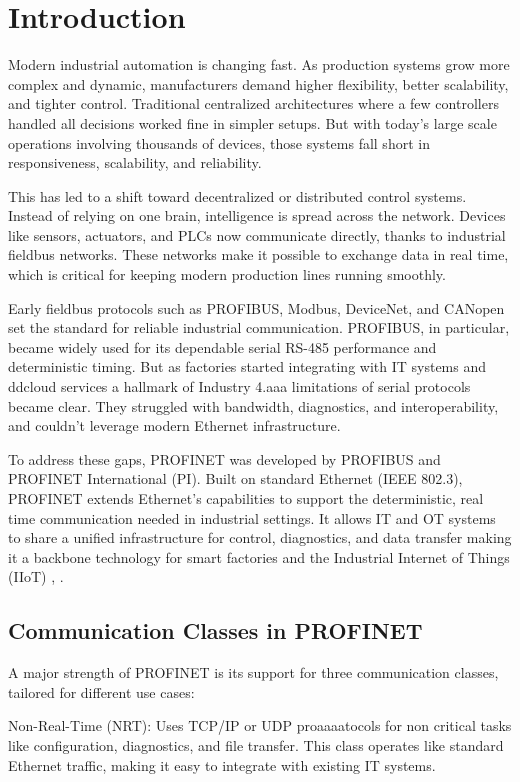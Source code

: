 \documentclass[conference]{IEEEtran}
\begin{document}
\section{Introduction}
Modern industrial automation is changing fast. As production systems grow more complex and dynamic, manufacturers demand higher flexibility, better scalability, and tighter control. Traditional centralized architectures where a few controllers handled all decisions worked fine in simpler setups. But with today’s large scale operations involving thousands of devices, those systems fall short in responsiveness, scalability, and reliability.

This has led to a shift toward decentralized or distributed control systems. Instead of relying on one brain, intelligence is spread across the network. Devices like sensors, actuators, and PLCs now communicate directly, thanks to industrial fieldbus networks. These networks make it possible to exchange data in real time, which is critical for keeping modern production lines running smoothly.

Early fieldbus protocols such as PROFIBUS, Modbus, DeviceNet, and CANopen set the standard for reliable industrial communication. PROFIBUS, in particular, became widely used for its dependable serial RS-485 performance and deterministic timing. But as factories started integrating with IT systems and ddcloud services a hallmark of Industry 4.aaa limitations of serial protocols became clear. They struggled with bandwidth, diagnostics, and interoperability, and couldn’t leverage modern Ethernet infrastructure.

To address these gaps, PROFINET was developed by PROFIBUS and PROFINET International (PI). Built on standard Ethernet (IEEE 802.3), PROFINET extends Ethernet’s capabilities to support the deterministic, real time communication needed in industrial settings. It allows IT and OT systems to share a unified infrastructure for control, diagnostics, and data transfer making it a backbone technology for smart factories and the Industrial Internet of Things (IIoT) \cite{galloway2012industrial}, \cite{neumann2007communication}.

\subsection{Communication Classes in PROFINET} 
A major strength of PROFINET is its support for three communication classes, tailored for different use cases:

Non-Real-Time (NRT): Uses TCP/IP or UDP proaaaatocols for non critical tasks like configuration, diagnostics, and file transfer. This class operates like standard Ethernet traffic, making it easy to integrate with existing IT systems.
\end{document}
